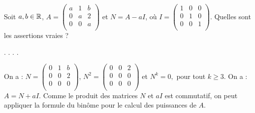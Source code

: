 \begin{question}
Soit $a,b\in \mathbb{R}$, $A=\left(\begin{array}{rcc}a&1&b\\0&a&2\\ 0&0&a\\ 
\end{array}\right)$ et  $N= A-aI$, où $I= \left(\begin{array}{rcc}
1&0&0\\0&1&0\\ 0&0&1\\ \end{array}\right)$. Quelles sont les assertions vraies ?
\begin{answers}  
.
.
.
.
\end{answers}
\vskip2mm
\begin{explanations} On a : $N=\left(\begin{array}{rcc}
0&1&b\\0&0&2\\ 0&0&0\\ \end{array}\right)$,  $N^2=\left(\begin{array}{rcc}0&0&2\\0&0&0\\ 0&0&0\\ 
\end{array}\right)$ et $N^k=0, $ pour tout $k\ge 3$.
\vskip0mm
On a : $A= N+aI$. Comme le produit des matrices $N$ et $aI$ est commutatif, on peut appliquer la formule du binôme pour le calcul des puissances de $A$.
\end{explanations}
\end{question}

